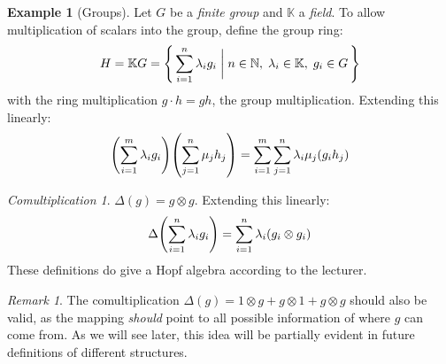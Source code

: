 \documentclass[svgnames]{article}
\theoremstyle{definition}
\newtheorem{Example}{Example}
\theoremstyle{remark}
\newtheorem*{Remark*}{Remark}
\theoremstyle{underline}
\theoremstyle{underline}
\newtheorem*{Comultiplication*}{Comultiplication}
\begin{document}
	\begin{Example}[Groups]
		Let $G$ be a \emph{finite group} and $\mathbb{K}$ a \emph{field}. To allow multiplication of scalars into the group, define the group ring:
		\begin{gather*}
		H = \mathbb KG = \qty{\, \sum_{i = 1}^n\lambda_i g_i \biggm| n \in \mathbb N,\; \lambda_i \in \mathbb K,\; g_i \in G \,}	
		\end{gather*}
		with the ring multiplication	$g \cdot h= gh$, the group multiplication. Extending this linearly:
			\begin{gather*}
			\pqty{\sum_{i = 1}^{m}\lambda_i g_i}\pqty{\sum_{j = 1}^{n}\mu_j h_j} = \sum_{i = 1}^m \sum_{j = 1}^n \lambda_i \mu_j(g_i h_j)
			\end{gather*}
		
		\begin{Comultiplication*}
			$ \Delta(g) = g \otimes g $. Extending this linearly:
			\begin{gather*}
				\Delta\pqty{\sum_{i = 1}^n \lambda_ig_i} = \sum_{i = 1}^n \lambda_i(g_i \otimes g_i)
			\end{gather*}
			These definitions do give a Hopf algebra according to the lecturer. 	
		\end{Comultiplication*}
		
		\begin{Remark*}
			The comultiplication $ \Delta(g) = 1 \otimes g + g \otimes 1 + g \otimes g$ should also be valid, as the mapping \emph{should} point to all possible information of where $g$ can come from. As we will see later, this idea will be partially evident in future definitions of different structures.
		\end{Remark*}
		
	\end{Example}
	
\end{document}
